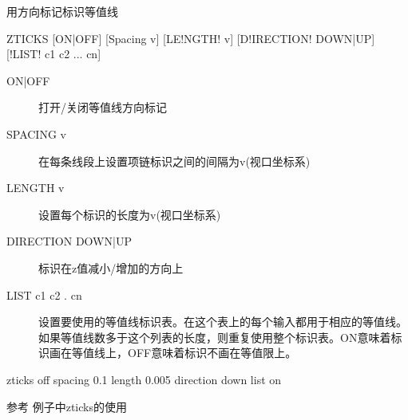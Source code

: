 \label{cmd:zticks}

用方向标记标识等值线

\begin{SACSTX}
ZTICKS [ON|OFF] [Spacing v] [LE!NGTH! v] [D!IRECTION! DOWN|UP]
    [!LIST! c1 c2 ... cn]
\end{SACSTX}

\begin{description}
\item [ON|OFF] 打开/关闭等值线方向标记
\item [SPACING v] 在每条线段上设置项链标识之间的间隔为v(视口坐标系)
\item [LENGTH v] 设置每个标识的长度为v(视口坐标系)
\item [DIRECTION DOWN|UP] 标识在z值减小/增加的方向上
\item [LIST c1 c2 . cn] 设置要使用的等值线标识表。在这个表上的每个输入都用于相应的等值线。如果等值线数多于这个列表的长度，则重复使用整个标识表。ON意味着标识画在等值线上，OFF意味着标识不画在等值限上。
\end{description}

\begin{SACDFT}
zticks off spacing 0.1 length 0.005 direction down list on
\end{SACDFT}

参考  例子中zticks的使用
